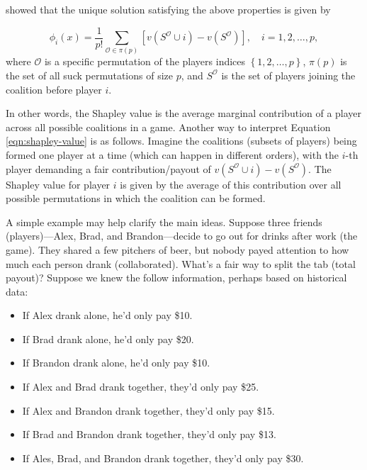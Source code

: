 \citep{shapley-2016-value} showed that the unique solution satisfying
the above properties is given by

\begin{equation}
\label{eqn:shapley-value}
\phi_i\left(x\right) = \frac{1}{p!} \sum_{\mathcal{O} \in \pi\left(p\right)} \left[v\left(S^\mathcal{O} \cup i\right) - v\left(S^\mathcal{O}\right)\right], \quad i = 1, 2, \dots, p,
\end{equation} where \(\mathcal{O}\) is a specific permutation of the
players indices \(\left\{1, 2, \dots, p\right\}\), \(\pi\left(p\right)\)
is the set of all suck permutations of size \(p\), and \(S^\mathcal{O}\)
is the set of players joining the coalition before player \(i\).

In other words, the Shapley value is the average marginal contribution
of a player across all possible coalitions in a game. Another way to
interpret Equation \eqref{eqn:shapley-value} is as follows. Imagine the
coalitions (subsets of players) being formed one player at a time (which
can happen in different orders), with the \(i\)-th player demanding a
fair contribution/payout of
\(v\left(S^\mathcal{O} \cup i\right) - v\left(S^\mathcal{O}\right)\).
The Shapley value for player \(i\) is given by the average of this
contribution over all possible permutations in which the coalition can
be formed.

A simple example may help clarify the main ideas. Suppose three friends
(players)---Alex, Brad, and Brandon---decide to go out for drinks after
work (the game). They shared a few pitchers of beer, but nobody payed
attention to how much each person drank (collaborated). What's a fair
way to split the tab (total payout)? Suppose we knew the follow
information, perhaps based on historical data:

\begin{itemize}

  \item If Alex drank alone, he'd only pay \$10.
  
  \item If Brad drank alone, he'd only pay \$20.
  
  \item If Brandon drank alone, he'd only pay \$10.
  
  \item If Alex and Brad drank together, they'd only pay \$25.
  
  \item If Alex and Brandon drank together, they'd only pay \$15.
  
  \item If Brad and Brandon drank together, they'd only pay \$13.
  
  \item If Ales, Brad, and Brandon drank together, they'd only pay \$30.

\end{itemize}

